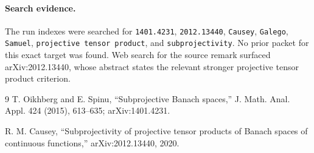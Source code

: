 \documentclass[11pt]{article}
\begin{document}
\paragraph{Search evidence.}
The run indexes were searched for \texttt{1401.4231}, \texttt{2012.13440},
\texttt{Causey}, \texttt{Galego}, \texttt{Samuel},
\texttt{projective tensor product}, and \texttt{subprojectivity}. No prior
packet for this exact target was found. Web search for the source remark
surfaced arXiv:2012.13440, whose abstract states the relevant stronger
projective tensor product criterion.

\begin{thebibliography}{9}
T. Oikhberg and E. Spinu,
``Subprojective Banach spaces,''
J. Math. Anal. Appl. 424 (2015), 613--635; arXiv:1401.4231.

R. M. Causey,
``Subprojectivity of projective tensor products of Banach spaces of continuous
functions,'' arXiv:2012.13440, 2020.
\end{thebibliography}
\end{document}
